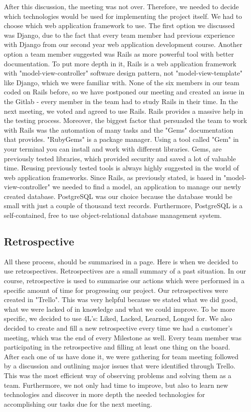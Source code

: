 \documentclass{l3proj}
\begin{document}
 After this discussion, the meeting was not over. Therefore, we needed to decide which technologies would be used for implementing the project itself. We had to choose which web application framework to use. The first option we discussed was Django, due to the fact that every team member had previous experience with Django from our second year web application development course. Another option a team member suggested was Rails as more powerful tool with better documentation. To put more depth in it, Rails is a web application framework with "model-view-controller" software design pattern, not "model-view-template" like Django, which we were familiar with. None of the six members in our team coded on Rails before, so we have postponed our meeting and created an issue in the Gitlab - every member in the team had to study Rails in their time. In the next meeting, we voted and agreed to use Rails. Rails provides a massive help in the testing process. Moreover, the biggest factor that persuaded the team to work with Rails was the automation of many tasks and the "Gems" documentation that provides. "RubyGems" is a package manager. Using a tool called "Gem" in your terminal you can install and work with different libraries. Gems, are previously tested libraries, which provided security and saved a lot of valuable time. Reusing previously tested tools is always highly suggested in the world of web application frameworks.
  Since Rails, as previously stated, is based in "model-view-controller" we needed to find a model, an application to manage our newly created database. PostgreSQL was our choice because the database would be small with just a couple of thousand text records. Furthermore, PostgreSQL is a self-contained, free to use object-relational database management system.
 
 \subsection{Retrospective}
\label{retrospective}
 
 All these process, should be summarised in a page. Here is when we decided to use retrospectives. Retrospectives are a small summary of a past situation. In our course, retrospective is used to summarise our actions which were performed in a specific amount of time for progressing our project. Our retrospectives were created in "Trello". This was very helpful because we stated what we did good, what we were lacked of in knowledge and what we could improve. To be more specific, we decided to use 4L's: Liked, Lacked, Learned, Longed for. We also decided to create and fill a new retrospective every time we had a customer's meeting, which was the end of every Milestone as well.  Every team member was participating in the retrospective and filling at least one thing on the board. After each one of us have done it, we were gathering for team meeting followed by a discussion and outlining major issues that were identified through Trello. This was the most efficient way of observing problems and solving them as a team. Furthermore, we not only had time to improve, but also to learn new technologies and discover in more depth the needed technologies for accomplishing our tasks due for the next meeting.
\end{document}
